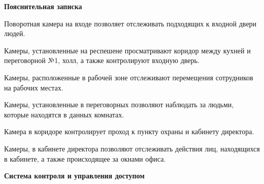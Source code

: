 \documentclass[a4paper,14pt]{extarticle}
\begin{document}
    \textbf{Пояснительная записка}
    \begin{spacing}{1.25}
        Поворотная камера на входе позволяет отслеживать подходящих к входной двери людей.

        Камеры, установленные на респешене просматривают коридор между кухней и переговорной №1, холл, а также контролируют входную дверь.

        Камеры, расположенные в рабочей зоне отслеживают перемещения сотрудников на рабочих местах. 

        Камеры, установленные в переговорных позволяют наблюдать за людьми, которые находятся в данных комнатах.

        Камера в коридоре контролирует проход к пункту охраны и кабинету директора.

        Камеры, в кабинете директора позволяют отслеживать действия лиц, находящихся в кабинете, а также происходящее за окнами офиса. 
    \end{spacing}

    \vspace{3ex}
    \textbf{\large{Система контроля и управления доступом}}
\end{document}
